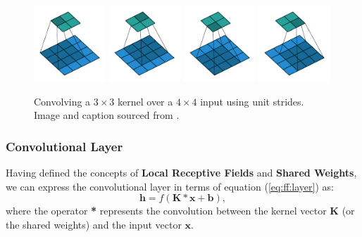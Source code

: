 \begin{figure}[htb]
    \centering
    \includegraphics[width=0.24\textwidth]{pdf/no_padding_no_strides_00.pdf}
    \includegraphics[width=0.24\textwidth]{pdf/no_padding_no_strides_01.pdf}
    \includegraphics[width=0.24\textwidth]{pdf/no_padding_no_strides_02.pdf}
    \includegraphics[width=0.24\textwidth]{pdf/no_padding_no_strides_03.pdf}
    \caption[Convolving a $3 \times 3$ kernel over a $4 \times 4$ input using unit strides.]{Convolving a $3 \times 3$ kernel over a $4 \times 4$ input using unit strides. Image and caption sourced from \cite{dumoulin2016guide}.}
    \label{fig:no_padding_no_strides}
\end{figure}

\subsubsection{Convolutional Layer}
Having defined the concepts of \textbf{Local Receptive Fields} and \textbf{Shared Weights}, we can express the convolutional layer in terms of equation (\ref{eq:ff:layer}) as:
\begin{equation}
\boldsymbol{h}=f\left(\boldsymbol{K}*\boldsymbol{x}+\boldsymbol{b}\right), \label{eq:conv:layer}
\end{equation}
where the operator \textbf{*} represents the convolution between the kernel vector \(\boldsymbol{K}\) (or the shared weights) and the input vector \(\boldsymbol{x}\).

